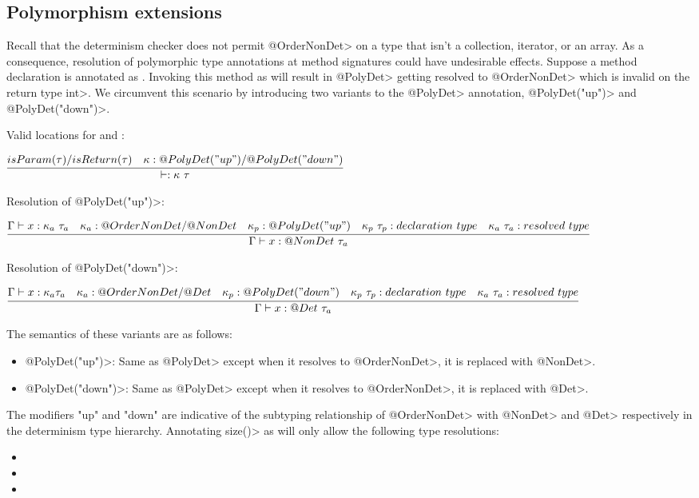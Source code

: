\subsection{Polymorphism extensions}\label{polymorphism-extensions}

Recall that the determinism checker does not permit \<@OrderNonDet> on a type that isn't a collection, iterator, or an array.
As a consequence, resolution of polymorphic type annotations at method signatures could have undesirable effects.
Suppose a method declaration is annotated as . Invoking this method
as  will result in \<@PolyDet> getting resolved to \<@OrderNonDet> which is invalid
on the return type \<int>. We circumvent this scenario by introducing two variants to the \<@PolyDet> annotation, \<@PolyDet("up")>
and \<@PolyDet("down")>. 

Valid locations for  and  :

$\infer{\vdash : \kappa \  \tau}{isParam(\tau) / isReturn(\tau) & \kappa : @PolyDet("up") / @PolyDet("down")}$

Resolution of \<@PolyDet("up")>:

$\infer{\Gamma \vdash x : @NonDet \ \tau_a}{\Gamma \vdash x : \kappa_a \ \tau_a &  \kappa_a : @OrderNonDet/@NonDet & \kappa_p : @PolyDet("up") & \kappa_p \ \tau_p : declaration \ type & \kappa_a \ \tau_a : resolved \ type}$

Resolution of \<@PolyDet("down")>:

$\infer{\Gamma \vdash x : @Det \  \tau_a}{\Gamma \vdash x :  \kappa_a \tau_a & \kappa_a : @OrderNonDet/@Det & \kappa_p : @PolyDet("down") & \kappa_p \ \tau_p : declaration \ type & \kappa_a \ \tau_a : resolved \ type}$


The semantics of these variants are as follows:
\begin{itemize}
    \item \<@PolyDet("up")>: Same as \<@PolyDet> except when it resolves to \<@OrderNonDet>, it is replaced with \<@NonDet>.
    \item \<@PolyDet("down")>: Same as \<@PolyDet> except when it resolves to \<@OrderNonDet>, it is replaced with \<@Det>.
\end{itemize} 
The modifiers "up" and "down" are indicative of the subtyping relationship of \<@OrderNonDet> with \<@NonDet> and \<@Det> respectively
in the determinism type hierarchy.
Annotating \<size()> as  will only allow the following type resolutions:
\begin{itemize}
    \item {}
    \item {}
    \item {}
\end{itemize}

